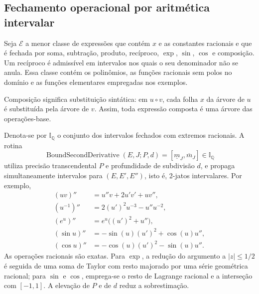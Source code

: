\documentclass[12pt,a4paper]{article}
\theoremstyle{preciso}
\theoremstyle{definition}
\newcommand{\Q}{\mathbb Q}
\newcommand{\EE}{\mathcal E}
\newcommand{\eqn}[2]{\begin{equation}\label{eq:#1}#2\end{equation}}
\theoremstyle{preciso}
\theoremstyle{preciso}
\theoremstyle{preciso}
\theoremstyle{preciso}
\theoremstyle{definition}
\theoremstyle{preciso}
\theoremstyle{definition}
\theoremstyle{preciso}
\theoremstyle{preciso}
\theoremstyle{definition}
\begin{document}
\subsection{Fechamento operacional por aritmética intervalar}
Seja $\EE$ a menor classe de expressões que contém $x$ e as constantes racionais e que é fechada por soma, subtração, produto, recíproco, $\exp$, $\sin$, $\cos$ e composição. Um recíproco é admissível em intervalos nos quais o seu denominador não se anula. Essa classe contém os polinômios, as funções racionais sem polos no domínio e as funções elementares empregadas nos exemplos.

Composição significa substituição sintática: em $u\circ v$, cada folha $x$ da árvore de $u$ é substituída pela árvore de $v$. Assim, toda expressão composta é uma árvore das operações-base.

Denota-se por $\mathbb I_{\Q}$ o conjunto dos intervalos fechados com extremos racionais. A rotina
\eqn{36}{\operatorname{BoundSecondDerivative}(E,J;P,d)
=[\underline m_J,\overline m_J]\in\mathbb I_{\Q}}
utiliza precisão transcendental $P$ e profundidade de subdivisão $d$, e propaga simultaneamente intervalos para $(E,E',E'')$, isto é, 2-jatos intervalares. Por exemplo,
\begin{align*}
(uv)''&=u''v+2u'v'+uv'',\\
(u^{-1})''&=2(u')^2u^{-3}-u''u^{-2},\\
(e^u)''&=e^u\bigl((u')^2+u''\bigr),\\
(\sin u)''&=-\sin(u)(u')^2+\cos(u)u'',\\
(\cos u)''&=-\cos(u)(u')^2-\sin(u)u''.
\end{align*}
As operações racionais são exatas. Para $\exp$, a redução do argumento a $|z|\le1/2$ é seguida de uma soma de Taylor com resto majorado por uma série geométrica racional; para $\sin$ e $\cos$, emprega-se o resto de Lagrange racional e a interseção com $[-1,1]$. A elevação de $P$ e de $d$ reduz a sobrestimação.
\end{document}
